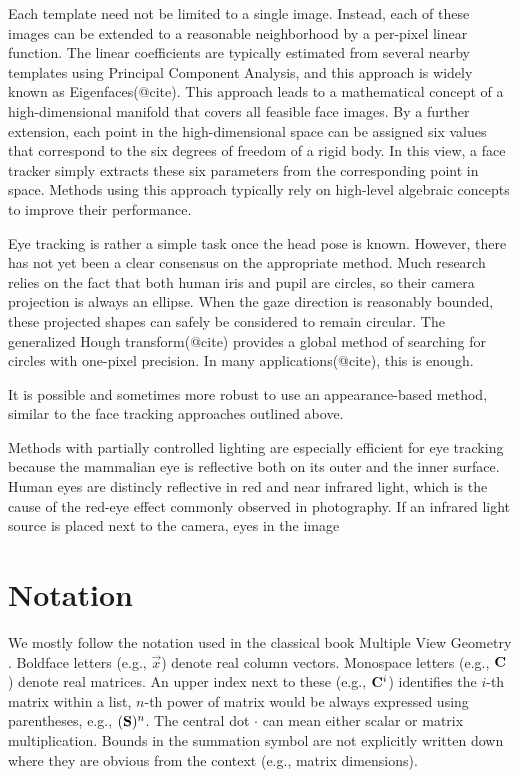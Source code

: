 Each template need not be limited to a single image.
Instead, each of these images can be extended to a reasonable neighborhood by a per-pixel linear function.
The linear coefficients are typically estimated from several nearby templates using Principal Component Analysis, and this approach is widely known as Eigenfaces(@cite).
This approach leads to a mathematical concept of a high-dimensional manifold that covers all feasible face images.
By a further extension, each point in the high-dimensional space can be assigned six values that correspond to the six degrees of freedom of a rigid body.
In this view, a face tracker simply extracts these six parameters from the corresponding point in space.
Methods using this approach typically rely on high-level algebraic concepts to improve their performance.

Eye tracking is rather a simple task once the head pose is known.
However, there has not yet been a clear consensus on the appropriate method.
Much research relies on the fact that both human iris and pupil are circles, so their camera projection is always an ellipse.
When the gaze direction is reasonably bounded, these projected shapes can safely be considered to remain circular.
The generalized Hough transform(@cite) provides a global method of searching for circles with one-pixel precision.
In many applications(@cite), this is enough.

It is possible and sometimes more robust to use an appearance-based method, similar to the face tracking approaches outlined above.
\todo{\dots}

\todo{\dots}
Methods with partially controlled lighting are especially efficient for eye tracking because the mammalian eye is reflective both on its outer and the inner surface.
Human eyes are distincly reflective in red and near infrared light, which is the cause of the red-eye effect commonly observed in photography.
If an infrared light source is placed next to the camera, eyes in the image




\section{Notation}

We mostly follow the notation used in the classical book Multiple View Geometry \cite{b:hartley04}.
Boldface letters (e.g., $\vec x$) denote real column vectors.
Monospace letters (e.g., $\mathbf{C}$) denote real matrices.
An upper index next to these (e.g., $\mathbf{C}^i$) identifies the $i$-th matrix within a list, $n$-th power of matrix would be always expressed using parentheses, e.g., $(\mathbf{S})^n$.
The central dot $\cdot$ can mean either scalar or matrix multiplication.
Bounds in the summation symbol are not explicitly written down where they are obvious from the context (e.g., matrix dimensions).

